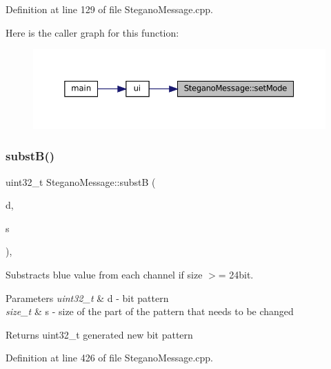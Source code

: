 Definition at line 129 of file Stegano\+Message.\+cpp.

Here is the caller graph for this function\+:
\nopagebreak
\begin{figure}[H]
\begin{center}
\leavevmode
\includegraphics[width=350pt]{classSteganoMessage_a3e06a73baa5744b5eb9152f4ae65f458_icgraph}
\end{center}
\end{figure}
\mbox{\label{classSteganoMessage_a7eb6fd157c777b2947603d018610ad0f}} 
\subsubsection{\texorpdfstring{substB()}{substB()}}
{\footnotesize\ttfamily uint32\+\_\+t Stegano\+Message\+::substB (\begin{DoxyParamCaption}\item[{uint32\+\_\+t}]{d,  }\item[{size\+\_\+t}]{s }\end{DoxyParamCaption})\hspace{0.3cm}{\ttfamily [static]}, {\ttfamily [private]}}



Substracts blue value from each channel if size $>$= 24bit. 


\begin{DoxyParams}{Parameters}
{\em uint32\+\_\+t} & d -\/ bit pattern \\
\hline
{\em size\+\_\+t} & s -\/ size of the part of the pattern that needs to be changed \\
\hline
\end{DoxyParams}
\begin{DoxyReturn}{Returns}
uint32\+\_\+t generated new bit pattern 
\end{DoxyReturn}


Definition at line 426 of file Stegano\+Message.\+cpp.

